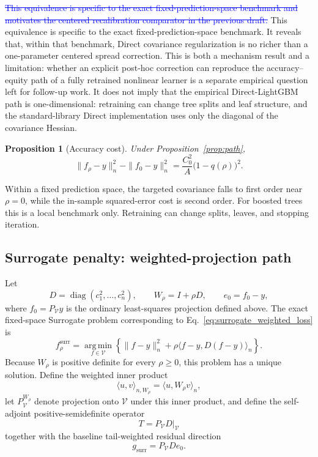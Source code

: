 \documentclass[10pt]{article}
\newtheorem{proposition}{Proposition}
\theoremstyle{definition}
\newcommand{\diag}{\operatorname{diag}}
\newcommand{\1}{\mathbf{1}}
\newcommand{\Vcal}{\mathcal{V}}
\newcommand{\argminop}{\operatorname*{arg\,min}}
\newcommand{\oldtext}[1]{\textcolor{blue}{\sout{#1}}}
\newcommand{\newtext}[1]{\textcolor{impGreen}{#1}}
\begin{document}
{\oldtext{This equivalence is specific to the exact fixed-prediction-space benchmark and motivates the centered recalibration comparator in the previous draft.}
\newtext{This equivalence is specific to the exact fixed-prediction-space benchmark. It reveals that, within that benchmark, Direct covariance regularization is no richer than a one-parameter centered spread correction. This is both a mechanism result and a limitation: whether an explicit post-hoc correction can reproduce the accuracy--equity path of a fully retrained nonlinear learner is a separate empirical question left for follow-up work.} It does not imply that the empirical Direct-LightGBM path is one-dimensional: retraining can change tree splits and leaf structure, and the standard-library Direct implementation uses only the diagonal of the covariance Hessian.
}

\begin{proposition}[Accuracy cost]
\label{prop:path_cost}
Under Proposition~\ref{prop:path},
\[
\|f_\rho-y\|_n^2-\|f_0-y\|_n^2
=
\frac{C_0^2}{A}\bigl(1-q(\rho)\bigr)^2.
\]
\end{proposition}

Within a fixed prediction space, the targeted covariance falls to first order near $\rho=0$, while the in-sample squared-error cost is second order. For boosted trees this is a local benchmark only. Retraining can change splits, leaves, and stopping iteration.

\subsection{\newtext{Surrogate penalty: weighted-projection path}}

{\color{impGreen}
Let
\[
D=\diag(c_1^2,\ldots,c_n^2),
\qquad
W_\rho=I+\rho D,
\qquad
e_0=f_0-y,
\]
where $f_0=P_{\Vcal}y$ is the ordinary least-squares projection defined above. The exact fixed-space Surrogate problem corresponding to Eq.~\eqref{eq:surrogate_weighted_loss} is
\begin{equation}
\label{eq:surrogate_fixed_space_problem}
f_\rho^{\mathrm{surr}}
=
\argminop_{f\in\Vcal}
\left\{
\|f-y\|_n^2
+
\rho\langle f-y,D(f-y)\rangle_n
\right\}.
\end{equation}
Because $W_\rho$ is positive definite for every $\rho\geq0$, this problem has a unique solution. Define the weighted inner product
\[
\langle u,v\rangle_{n,W_\rho}
=
\langle u,W_\rho v\rangle_n,
\]
let $P_{\Vcal}^{W_\rho}$ denote projection onto $\Vcal$ under this inner product, and define the self-adjoint positive-semidefinite operator
\[
T=P_{\Vcal}D\big|_{\Vcal}
\]
together with the baseline tail-weighted residual direction
\[
g_{\mathrm{surr}}
=
P_{\Vcal}De_0.
\]}
\end{document}
